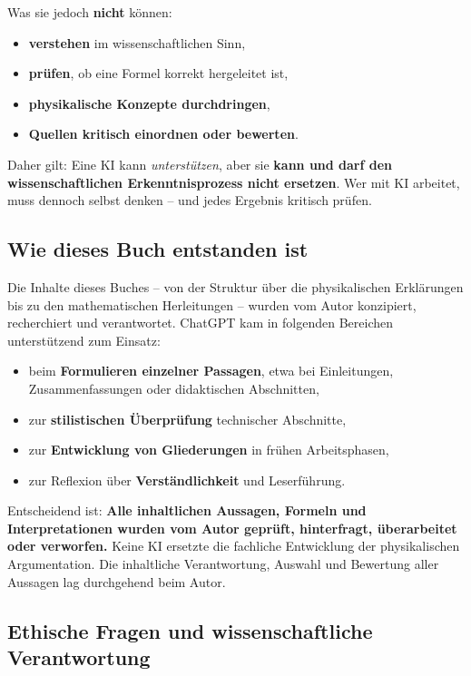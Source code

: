 Was sie jedoch \textbf{nicht} können:

\begin{itemize}
	\item \textbf{verstehen} im wissenschaftlichen Sinn,
	\item \textbf{prüfen}, ob eine Formel korrekt hergeleitet ist,
	\item \textbf{physikalische Konzepte durchdringen},
	\item \textbf{Quellen kritisch einordnen oder bewerten}.
\end{itemize}

Daher gilt: Eine KI kann \emph{unterstützen}, aber sie \textbf{kann und darf den wissenschaftlichen Erkenntnisprozess nicht ersetzen}. Wer mit KI arbeitet, muss dennoch selbst denken -- und jedes Ergebnis kritisch prüfen.

\subsection*{Wie dieses Buch entstanden ist}

Die Inhalte dieses Buches -- von der Struktur über die physikalischen Erklärungen bis zu den mathematischen Herleitungen -- wurden vom Autor konzipiert, recherchiert und verantwortet. ChatGPT kam in folgenden Bereichen unterstützend zum Einsatz:

\begin{itemize}
	\item beim \textbf{Formulieren einzelner Passagen}, etwa bei Einleitungen, Zusammenfassungen oder didaktischen Abschnitten,
	\item zur \textbf{stilistischen Überprüfung} technischer Abschnitte,
	\item zur \textbf{Entwicklung von Gliederungen} in frühen Arbeitsphasen,
	\item zur Reflexion über \textbf{Verständlichkeit} und Leserführung.
\end{itemize}

Entscheidend ist: \textbf{Alle inhaltlichen Aussagen, Formeln und Interpretationen wurden vom Autor geprüft, hinterfragt, überarbeitet oder verworfen.} Keine KI ersetzte die fachliche Entwicklung der physikalischen Argumentation. Die inhaltliche Verantwortung, Auswahl und Bewertung aller Aussagen lag durchgehend beim Autor.

\subsection*{Ethische Fragen und wissenschaftliche Verantwortung}

